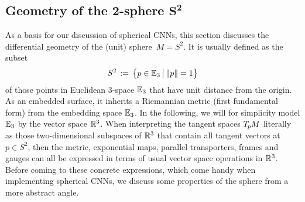 

\subsection%
    [Geometry of the 2-sphere \texorpdfstring{$S^2$}{S2}]%
    {Geometry of the 2-sphere $\boldsymbol{S^2}$}
\label{sec:sphere_geometry}

As a basis for our discussion of spherical CNNs, this section discusses the differential geometry of the (unit) sphere~$M = S^2$.
It is usually defined as the subset
\begin{align}
    S^2 \,:=\, \big\{ p\in\mathbb{E}_3 \,\big|\, \lVert p\rVert = 1 \big\}
\end{align}
of those points in Euclidean 3-space $\mathbb{E}_3$ that have unit distance from the origin.
As an embedded surface, it inherits a Riemannian metric (first fundamental form) from the embedding space $\mathbb{E}_3$.
In the following, we will for simplicity model $\mathbb{E}_3$ by the vector space $\mathbb{R}^3$.
When interpreting the tangent spaces $T_{\mkern-1.5mu p}\mkern-.5muM$ literally as those two-dimensional subspaces of $\mathbb{R}^3$
that contain all tangent vectors at $p \in S^2$, then the metric, exponential maps, parallel transporters, frames and gauges can all be expressed in terms of usual vector space operations in $\mathbb{R}^3$.
Before coming to these concrete expressions, which come handy when implementing spherical CNNs,
we discuss some properties of the sphere from a more abstract angle.


